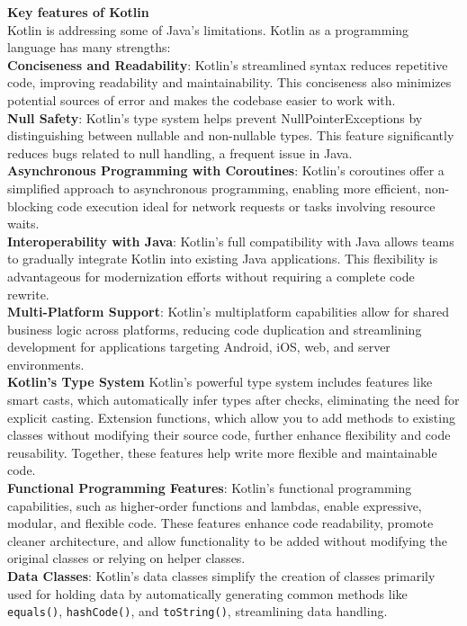 \noindent \textbf{Key features of Kotlin}
\\
\noindent Kotlin is addressing some of Java's limitations. Kotlin as a programming language has many strengths:
\\
\textbf{Conciseness and Readability}: Kotlin’s streamlined syntax reduces repetitive code, improving readability and maintainability. This conciseness also minimizes potential sources of error and makes the codebase easier to work with.
\\
\textbf{Null Safety}: Kotlin’s type system helps prevent NullPointerExceptions by distinguishing between nullable and non-nullable types. This feature significantly reduces bugs related to null handling, a frequent issue in Java.
\\
\textbf{Asynchronous Programming with Coroutines}: Kotlin’s coroutines offer a simplified approach to asynchronous programming, enabling more efficient, non-blocking code execution ideal for network requests or tasks involving resource waits.
\\
\textbf{Interoperability with Java}: Kotlin’s full compatibility with Java allows teams to gradually integrate Kotlin into existing Java applications. This flexibility is advantageous for modernization efforts without requiring a complete code rewrite.
\\
\textbf{Multi-Platform Support}: Kotlin’s multiplatform capabilities allow for shared business logic across platforms, reducing code duplication and streamlining development for applications targeting Android, iOS, web, and server environments.
\\
\textbf{Kotlin’s Type System}
Kotlin’s powerful type system includes features like smart casts, which automatically infer types after checks, eliminating the need for explicit casting. Extension functions, which allow you to add methods to existing classes without modifying their source code, further enhance flexibility and code reusability. Together, these features help write more flexible and maintainable code.
\\
\textbf{Functional Programming Features}: Kotlin’s functional programming capabilities, such as higher-order functions and lambdas, enable expressive, modular, and flexible code. These features enhance code readability, promote cleaner architecture, and allow functionality to be added without modifying the original classes or relying on helper classes.
\\
\textbf{Data Classes}: Kotlin’s data classes simplify the creation of classes primarily used for holding data by automatically generating common methods like \texttt{equals()}, \texttt{hashCode()}, and \texttt{toString()}, streamlining data handling.


